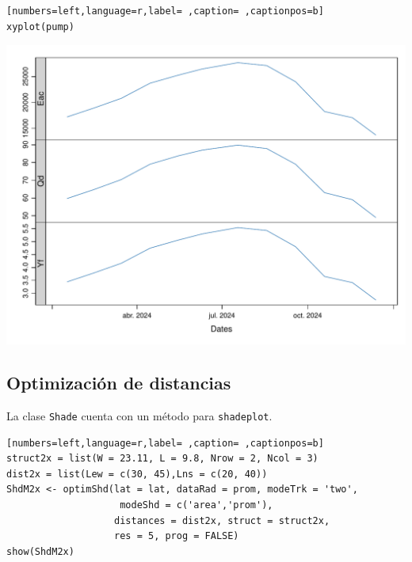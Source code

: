 \begin{lstlisting}[numbers=left,language=r,label= ,caption= ,captionpos=b]
xyplot(pump)
\end{lstlisting}

\begin{center}
\includegraphics[width=.9\linewidth]{figuras/codigo-prodpvps.pdf}
\end{center}

\subsection{Optimización de distancias}
\label{sec:org488e576}
La clase \texttt{Shade} cuenta con un método para \texttt{shadeplot}.
\begin{lstlisting}[numbers=left,language=r,label= ,caption= ,captionpos=b]
struct2x = list(W = 23.11, L = 9.8, Nrow = 2, Ncol = 3)
dist2x = list(Lew = c(30, 45),Lns = c(20, 40))
ShdM2x <- optimShd(lat = lat, dataRad = prom, modeTrk = 'two',
                    modeShd = c('area','prom'),
                   distances = dist2x, struct = struct2x,
                   res = 5, prog = FALSE)
show(ShdM2x)
\end{lstlisting}


